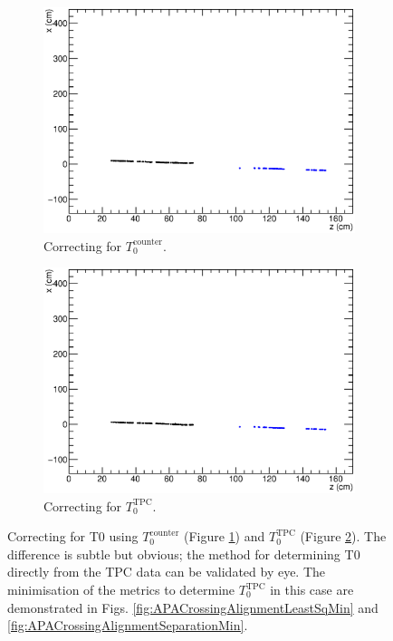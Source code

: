 \begin{figure}
  \centering
  \begin{subfigure}[t]{0.48\linewidth}
    \centering
    \includegraphics[width=\textwidth]{t0correction_before.eps}
    \caption{Correcting for $T_0^{\mathrm{counter}}$.}
    \label{fig:TPCCounterT0CorrectionCounter}
  \end{subfigure}
  \hfill
  \begin{subfigure}[t]{0.48\linewidth}
    \centering
    \includegraphics[width=\textwidth]{t0correction_after.eps}
    \caption{Correcting for $T_0^{\mathrm{TPC}}$.}
    \label{fig:TPCCounterT0CorrectionTPC}
  \end{subfigure}
  \caption[Correcting for T0 using $T_0^{\mathrm{counter}}$ and $T_0^{\mathrm{TPC}}$.]{Correcting for T0 using $T_0^{\mathrm{counter}}$ (Figure \ref{fig:TPCCounterT0CorrectionCounter}) and $T_0^{\mathrm{TPC}}$ (Figure \ref{fig:TPCCounterT0CorrectionTPC}).  The difference is subtle but obvious; the method for determining T0 directly from the TPC data can be validated by eye.  The minimisation of the metrics to determine $T_0^{\mathrm{TPC}}$ in this case are demonstrated in Figs. \ref{fig:APACrossingAlignmentLeastSqMin} and \ref{fig:APACrossingAlignmentSeparationMin}.}
  \label{fig:TPCCounterT0Correction}
\end{figure}


